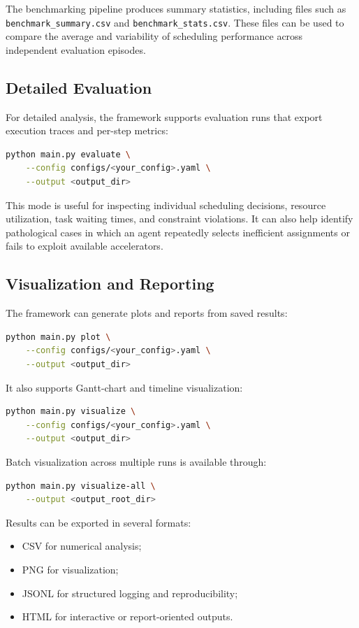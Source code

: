 \documentclass[conference]{IEEEtran}
\begin{document}
The benchmarking pipeline produces summary statistics, including files such as
\texttt{benchmark\_summary.csv} and \texttt{benchmark\_stats.csv}. These files
can be used to compare the average and variability of scheduling performance
across independent evaluation episodes.

\subsection{Detailed Evaluation}
For detailed analysis, the framework supports evaluation runs that export
execution traces and per-step metrics:
\begin{lstlisting}[language=bash]
python main.py evaluate \
    --config configs/<your_config>.yaml \
    --output <output_dir>
\end{lstlisting}

This mode is useful for inspecting individual scheduling decisions, resource
utilization, task waiting times, and constraint violations. It can also help
identify pathological cases in which an agent repeatedly selects inefficient
assignments or fails to exploit available accelerators.

\subsection{Visualization and Reporting}
The framework can generate plots and reports from saved results:
\begin{lstlisting}[language=bash]
python main.py plot \
    --config configs/<your_config>.yaml \
    --output <output_dir>
\end{lstlisting}

It also supports Gantt-chart and timeline visualization:
\begin{lstlisting}[language=bash]
python main.py visualize \
    --config configs/<your_config>.yaml \
    --output <output_dir>
\end{lstlisting}

Batch visualization across multiple runs is available through:
\begin{lstlisting}[language=bash]
python main.py visualize-all \
    --output <output_root_dir>
\end{lstlisting}

Results can be exported in several formats:
\begin{itemize}
    \item CSV for numerical analysis;
    \item PNG for visualization;
    \item JSONL for structured logging and reproducibility;
    \item HTML for interactive or report-oriented outputs.
\end{itemize}
\end{document}
